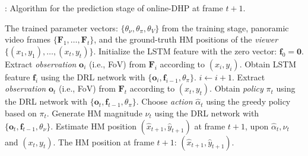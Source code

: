 \documentclass[10pt,journal,compsoc]{IEEEtran}
\begin{document}
\begin{algorithm}
   \caption{\hspace{-.3em}: Algorithm for the prediction stage of online-DHP at frame $t+1$.}
   \label{online-DHP-algorithm-predicting}
   \footnotesize
\begin{algorithmic}[1]
    The trained parameter vectors: $\{ \theta_{\nu}, \theta_{\pi}, \theta_{V} \}$ from the training stage, panoramic video frames $\{\mathbf{F}_1, \ldots, \mathbf{F}_t \}$, and the ground-truth HM positions of the \textit{viewer} $\{(x_{1},y_{1}),\ldots, (x_{t},y_{t})\}$.
   \STATE Initialize the LSTM feature with the zero vector: $\mathbf{f}_0=\mathbf{0}$.
       \STATE Extract \textit{observation} $\mathbf{o}_i$ (i.e., FoV) from $\mathbf{F}_i$ according to $(x_{i},y_{i})$.
       \STATE Obtain LSTM feature $\mathbf{f}_{i}$ using the DRL network with $\{\mathbf{o}_{i},\!\mathbf{f}_{i-1},\! \theta_{\pi}\}$.
       \STATE $i \leftarrow i+1$.
   \ENDFOR
   \STATE Extract \textit{observation} $\mathbf{o}_t$ (i.e., FoV) from $\mathbf{F}_t$ according to $(x_{t},y_{t})$.
   \STATE Obtain \textit{policy} $\pi_{t}$ using the DRL network with $\{\mathbf{o}_{t},\!\mathbf{f}_{t-1},\! \theta_{\pi}\}$.
   \STATE Choose \textit{action} $\hat{\alpha}_{t}$ using the greedy policy based on $\pi_{t}$.
   \STATE Generate HM magnitude $\hat{\nu}_{t}$ using the DRL network with $\{\mathbf{o}_{t}, \mathbf{f}_{t-1}, \theta_{\nu}\}$.
   \STATE Estimate HM position $(\!\hat{x}_{t+1}\!,\!\hat{y}_{t+1}\!)$ at frame $\!t+1$, upon $\hat{\alpha}_{t},\hat{\nu}_{t}$ and $(\!x_{t}\!,\!y_{t}\!)$.
    The HM position at frame $\!t+1$: $(\hat{x}_{t+1}\!,\!\hat{y}_{t+1})$.
   \end{algorithmic}
\end{algorithm}
\vspace{-1em}
\end{document}
